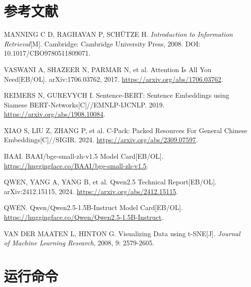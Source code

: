 \documentclass[UTF8,zihao=-4,a4paper,oneside]{ctexrep}
\begin{document}
\chapter*{参考文献}


\noindent [1] MANNING C D, RAGHAVAN P, SCHÜTZE H. \emph{Introduction to Information Retrieval}[M]. Cambridge: Cambridge University Press, 2008. DOI: 10.1017/CBO9780511809071.\par

\noindent [2] VASWANI A, SHAZEER N, PARMAR N, et al. Attention Is All You Need[EB/OL]. arXiv:1706.03762, 2017. \url{https://arxiv.org/abs/1706.03762}.\par

\noindent [3] REIMERS N, GUREVYCH I. Sentence-BERT: Sentence Embeddings using Siamese BERT-Networks[C]//EMNLP-IJCNLP. 2019. \url{https://arxiv.org/abs/1908.10084}.\par

\noindent [4] XIAO S, LIU Z, ZHANG P, et al. C-Pack: Packed Resources For General Chinese Embeddings[C]//SIGIR. 2024. \url{https://arxiv.org/abs/2309.07597}.\par

\noindent [5] BAAI. BAAI/bge-small-zh-v1.5 Model Card[EB/OL]. \url{https://huggingface.co/BAAI/bge-small-zh-v1.5}.\par

\noindent [6] QWEN, YANG A, YANG B, et al. Qwen2.5 Technical Report[EB/OL]. arXiv:2412.15115, 2024. \url{https://arxiv.org/abs/2412.15115}.\par

\noindent [7] QWEN. Qwen/Qwen2.5-1.5B-Instruct Model Card[EB/OL]. \url{https://huggingface.co/Qwen/Qwen2.5-1.5B-Instruct}.\par

\noindent [8] VAN DER MAATEN L, HINTON G. Visualizing Data using t-SNE[J]. \emph{Journal of Machine Learning Research}, 2008, 9: 2579-2605.\par

\appendix
{}


\chapter{运行命令}
\end{document}
